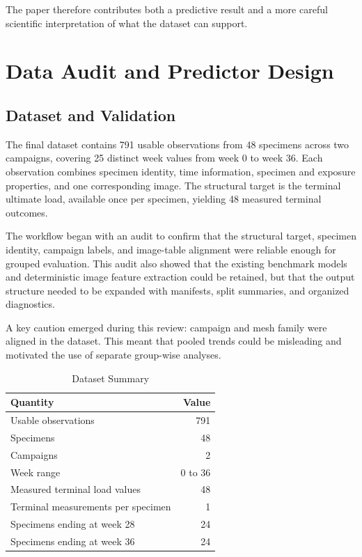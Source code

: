 \documentclass[conference]{IEEEtran}
\begin{document}
The paper therefore contributes both a predictive result and a more careful scientific interpretation of what the dataset can support.

\section{Data Audit and Predictor Design}
\subsection{Dataset and Validation}
The final dataset contains 791 usable observations from 48 specimens across two campaigns, covering 25 distinct week values from week 0 to week 36. Each observation combines specimen identity, time information, specimen and exposure properties, and one corresponding image. The structural target is the terminal ultimate load, available once per specimen, yielding 48 measured terminal outcomes.

The workflow began with an audit to confirm that the structural target, specimen identity, campaign labels, and image-table alignment were reliable enough for grouped evaluation. This audit also showed that the existing benchmark models and deterministic image feature extraction could be retained, but that the output structure needed to be expanded with manifests, split summaries, and organized diagnostics.

A key caution emerged during this review: campaign and mesh family were aligned in the dataset. This meant that pooled trends could be misleading and motivated the use of separate group-wise analyses.

\begin{table}[t]
    \caption{Dataset Summary}
    \label{tab:dataset}
    \centering
    \small
    \begin{tabular}{lr}
        \toprule
        Quantity & Value \\
        \midrule
        Usable observations & 791 \\
        Specimens & 48 \\
        Campaigns & 2 \\
        Week range & 0 to 36 \\
        Measured terminal load values & 48 \\
        Terminal measurements per specimen & 1 \\
        Specimens ending at week 28 & 24 \\
        Specimens ending at week 36 & 24 \\
        \bottomrule
    \end{tabular}
\end{table}
\end{document}
